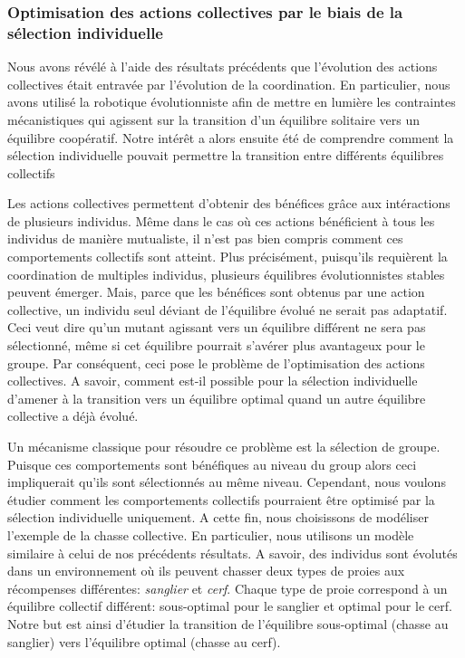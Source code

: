 		\subsubsection{Optimisation des actions collectives par le biais de la sélection individuelle}

			Nous avons révélé à l'aide des résultats précédents que l'évolution des actions collectives était entravée par l'évolution de la coordination. En particulier, nous avons utilisé la robotique évolutionniste afin de mettre en lumière les contraintes mécanistiques qui agissent sur la transition d'un équilibre solitaire vers un équilibre coopératif. Notre intérêt a alors ensuite été de comprendre comment la sélection individuelle pouvait permettre la transition entre différents équilibres collectifs

			Les actions collectives permettent d'obtenir des bénéfices grâce aux intéractions de plusieurs individus. Même dans le cas où ces actions bénéficient à tous les individus de manière mutualiste, il n'est pas bien compris comment ces comportements collectifs sont atteint. Plus précisément, puisqu'ils requièrent la coordination de multiples individus, plusieurs équilibres évolutionnistes stables peuvent émerger. Mais, parce que les bénéfices sont obtenus par une action collective, un individu seul déviant de l'équilibre évolué ne serait pas adaptatif. Ceci veut dire qu'un mutant agissant vers un équilibre différent ne sera pas sélectionné, même si cet équilibre pourrait s'avérer plus avantageux pour le groupe. Par conséquent, ceci pose le problème de l'optimisation des actions collectives. A savoir, comment est-il possible pour la sélection individuelle d'amener à la transition vers un équilibre optimal quand un autre équilibre collective a déjà évolué.

			Un mécanisme classique pour résoudre ce problème est la sélection de groupe. Puisque ces comportements sont bénéfiques au niveau du group alors ceci impliquerait qu'ils sont sélectionnés au même niveau. Cependant, nous voulons étudier comment les comportements collectifs pourraient être optimisé par la sélection individuelle uniquement. A cette fin, nous choisissons de modéliser l'exemple de la chasse collective. En particulier, nous utilisons un modèle similaire à celui de nos précédents résultats. A savoir, des individus sont évolutés dans un environnement où ils peuvent chasser deux types de proies aux récompenses différentes: \emph{sanglier} et \emph{cerf}. Chaque type de proie correspond à un équilibre collectif différent: sous-optimal pour le sanglier et optimal pour le cerf. Notre but est ainsi d'étudier la transition de l'équilibre sous-optimal (chasse au sanglier) vers l'équilibre optimal (chasse au cerf).

